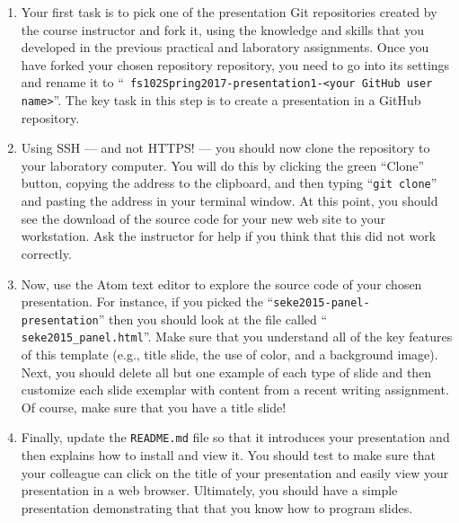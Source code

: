 \begin{enumerate}


  \item Your first task is to pick one of the presentation Git repositories created by the course instructor and fork
    it, using the knowledge and skills that you developed in the previous practical and laboratory assignments. Once you
    have forked your chosen repository repository, you need to go into its settings and rename it to ``{\tt
    fs102Spring2017-presentation1-<your GitHub user name>}''. The key task in this step is to create a 
    presentation in a GitHub repository.

  \item Using SSH --- and not HTTPS! --- you should now clone the repository to your laboratory computer. You will do
    this by clicking the green ``Clone'' button, copying the address to the clipboard, and then typing ``{\tt git
    clone}'' and pasting the address in your terminal window. At this point, you should see the download of the source
    code for your new web site to your workstation. Ask the instructor for help if you think that this did not work
    correctly.

  \item Now, use the Atom text editor to explore the source code of your chosen presentation. For instance, if you
    picked the ``{\tt seke2015-panel-presentation}'' then you should look at the file called ``{\tt
    seke2015\_panel.html}''. Make sure that you understand all of the key features of this template (e.g., title slide,
    the use of color, and a background image). Next, you should delete all but one example of each type of slide and
    then customize each slide exemplar with content from a recent writing assignment. Of course, make sure that you have
    a title slide!

  \item Finally, update the {\tt README.md} file so that it introduces your presentation and then explains how to
    install and view it. You should test to make sure that your colleague can click on the title of your presentation
    and easily view your presentation in a web browser. Ultimately, you should have a simple presentation demonstrating
    that that you know how to program slides.

\end{enumerate}

